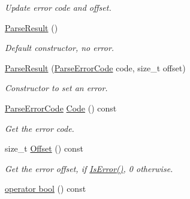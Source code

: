 \begin{DoxyCompactItemize}
\begin{DoxyCompactList}\small\item\em Update error code and offset. \end{DoxyCompactList}\item 
\hyperlink{struct_parse_result_acd4a266f815bec59fa27f64f1923fe9e}{Parse\+Result} ()\hypertarget{struct_parse_result_acd4a266f815bec59fa27f64f1923fe9e}{}\label{struct_parse_result_acd4a266f815bec59fa27f64f1923fe9e}

\begin{DoxyCompactList}\small\item\em Default constructor, no error. \end{DoxyCompactList}\item 
\hyperlink{struct_parse_result_a38ca49a53e80633d0864ad5026adaf84}{Parse\+Result} (\hyperlink{group___r_a_p_i_d_j_s_o_n___e_r_r_o_r_s_ga8d4b32dfc45840bca189ade2bbcb6ba7}{Parse\+Error\+Code} code, size\+\_\+t offset)\hypertarget{struct_parse_result_a38ca49a53e80633d0864ad5026adaf84}{}\label{struct_parse_result_a38ca49a53e80633d0864ad5026adaf84}

\begin{DoxyCompactList}\small\item\em Constructor to set an error. \end{DoxyCompactList}\item 
\hyperlink{group___r_a_p_i_d_j_s_o_n___e_r_r_o_r_s_ga8d4b32dfc45840bca189ade2bbcb6ba7}{Parse\+Error\+Code} \hyperlink{struct_parse_result_a1062b22f0d006e2f8a5b8c74385ff52d}{Code} () const \hypertarget{struct_parse_result_a1062b22f0d006e2f8a5b8c74385ff52d}{}\label{struct_parse_result_a1062b22f0d006e2f8a5b8c74385ff52d}

\begin{DoxyCompactList}\small\item\em Get the error code. \end{DoxyCompactList}\item 
size\+\_\+t \hyperlink{struct_parse_result_aa65430daa3920be0d42dc4baed86df69}{Offset} () const \hypertarget{struct_parse_result_aa65430daa3920be0d42dc4baed86df69}{}\label{struct_parse_result_aa65430daa3920be0d42dc4baed86df69}

\begin{DoxyCompactList}\small\item\em Get the error offset, if \hyperlink{struct_parse_result_a07c35a6769f5cb8a73cbc56c41e60a2a}{Is\+Error()}, 0 otherwise. \end{DoxyCompactList}\item 
\hyperlink{struct_parse_result_a74ab79dfa41d390002d1ea188a749bce}{operator bool} () const \hypertarget{struct_parse_result_a74ab79dfa41d390002d1ea188a749bce}{}\label{struct_parse_result_a74ab79dfa41d390002d1ea188a749bce}


\end{DoxyCompactItemize}
